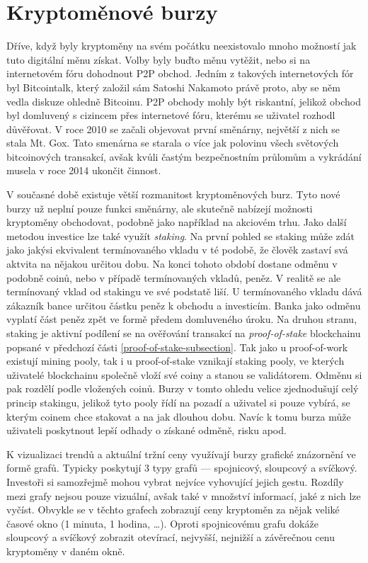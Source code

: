\section{Kryptoměnové burzy}
\label{sec:Exchanges}
Dříve, když byly kryptoměny na svém počátku neexistovalo mnoho možností jak tuto digitální měnu získat. Volby byly buďto měnu vytěžit, nebo
si na internetovém fóru dohodnout P2P obchod. Jedním z takových internetových fór byl Bitcointalk, který založil sám Satoshi Nakamoto právě proto,
aby se něm vedla diskuze ohledně Bitcoinu. P2P obchody mohly být riskantní, jelikož obchod byl domluvený s cizincem přes internetové fóru, kterému
se uživatel rozhodl důvěřovat. V roce 2010 se začali objevovat první směnárny, největší z nich se stala Mt. Gox. Tato smenárna se starala o více jak polovinu
všech světových bitcoinových transakcí, avšak kvůli častým bezpečnostním průlomům a vykrádání musela v roce 2014 ukončit činnost.

V současné době existuje větší rozmanitost kryptoměnových burz. Tyto nové burzy už neplní pouze funkci směnárny, ale skutečně nabízejí možnosti
kryptoměny obchodovat, podobně jako například na akciovém trhu. Jako další metodou investice lze také využít \emph{staking}. Na první pohled se staking
může zdát jako jakýsi ekvivalent termínovaného vkladu v té podobě, že člověk zastaví svá aktvita na nějakou určitou dobu. Na konci tohoto období dostane
odměnu v podobně coinů, nebo v případě termínovaných vkladů, peněz. V realitě se ale termínovaný vklad od stakingu ve své podstatě liší. U termínovaného
vkladu dává zákazník bance určitou částku peněz k obchodu a investicím. Banka jako odměnu vyplatí část peněz zpět ve formě předem domluveného úroku.
Na druhou stranu, staking je aktivní podílení se na ověřování transakcí na \emph{proof-of-stake} blockchainu popsané v předchozí části
\ref{proof-of-stake-subsection}. Tak jako u proof-of-work existují mining pooly, tak i u proof-of-stake vznikají staking pooly, ve kterých uživatelé
blockchainu společně vloží své coiny a stanou se validátorem. Odměnu si pak rozdělí podle vložených coinů. Burzy v tomto ohledu velice zjednodušují
celý princip stakingu, jelikož tyto pooly řídí na pozadí a uživatel si pouze vybírá, se kterým coinem chce stakovat a na jak dlouhou dobu. Navíc k tomu
burza může uživateli poskytnout lepší odhady o získané odměně, risku apod.

K vizualizaci trendů a aktuální tržní ceny využívají burzy grafické znázornění ve formě grafů. Typicky poskytují 3 typy grafů --- spojnicový, sloupcový a svíčkový.
Investoři si samozřejmě mohou vybrat nejvíce vyhovující jejich gestu. Rozdíly mezi grafy nejsou pouze vizuální, avšak také v množství informací, jaké z nich lze vyčíst.
Obvykle se v těchto grafech zobrazují ceny kryptoměn za nějak veliké časové okno (1 minuta, 1 hodina, \ldots). Oproti spojnicovému grafu dokáže sloupcový a svíčkový
zobrazit otevírací, nejvyšší, nejnižší a závěrečnou cenu kryptoměny v daném okně.

